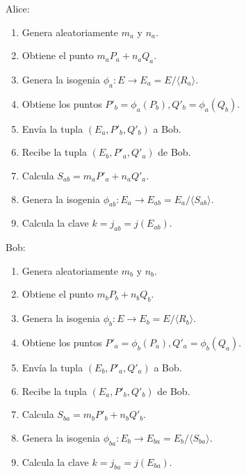 \documentclass[
  a4paper,
  12pt,
  spanish,
]{scrartcl}
\begin{document}
Alice:

\begin{enumerate}
  \item Genera aleatoriamente \(m_a\) y \(n_a\).
  \item Obtiene el punto \(m_aP_a + n_aQ_a\).
  \item Genera la isogenia \(\phi_a: E \to E_a = E/\langle R_a \rangle\).
  \item Obtiene los puntos \(P'_b = \phi_a(P_b), Q'_b = \phi_a(Q_b)\).
  \item Envía la tupla \((E_a, P'_b, Q'_b)\) a Bob.
  \item Recibe la tupla \((E_b, P'_a, Q'_a)\) de Bob.
  \item Calcula \(S_{ab} = m_aP'_a + n_aQ'_a\).
  \item Genera la isogenia \(\phi_{ab} : E_a \to E_{ab} = E_a/\langle S_{ab} \rangle\).
  \item Calcula la clave \(k = j_{ab} = j(E_{ab})\).
\end{enumerate}

Bob:

\begin{enumerate}
  \item Genera aleatoriamente \(m_b\) y \(n_b\).
  \item Obtiene el punto \(m_bP_b + n_bQ_b\).
  \item Genera la isogenia \(\phi_b: E \to E_b = E/\langle R_b \rangle\).
  \item Obtiene los puntos \(P'_a = \phi_b(P_a), Q'_a = \phi_b(Q_a)\).
  \item Envía la tupla \((E_b, P'_a, Q'_a)\) a Bob.
  \item Recibe la tupla \((E_a, P'_b, Q'_b)\) de Bob.
  \item Calcula \(S_{ba} = m_bP'_b + n_bQ'_b\).
  \item Genera la isogenia \(\phi_{ba} : E_b \to E_{ba} = E_b/\langle S_{ba} \rangle\).
  \item Calcula la clave \(k = j_{ba} = j(E_{ba})\).
\end{enumerate}





\newpage
\printbibliography
\end{document}
